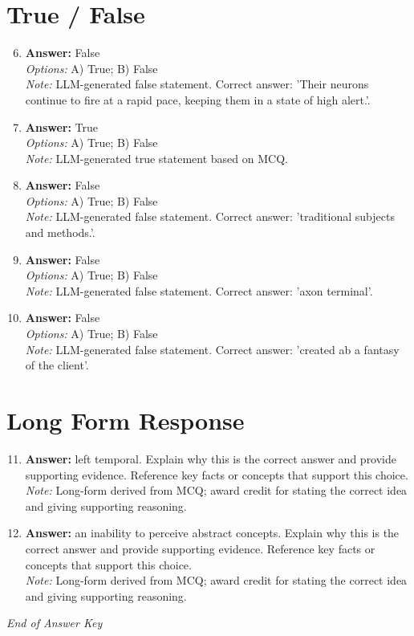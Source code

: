 \documentclass[12pt]{article}
\begin{document}
\section*{True / False}
\begin{enumerate}[label=\arabic*.]
\setcounter{enumi}{5}
\item \textbf{Answer:} False
\\ \textit{Options:} A) True; B) False
\\ \textit{Note:} LLM-generated false statement. Correct answer: 'Their neurons continue to fire at a rapid pace, keeping them in a state of high alert.'.
\item \textbf{Answer:} True
\\ \textit{Options:} A) True; B) False
\\ \textit{Note:} LLM-generated true statement based on MCQ.
\item \textbf{Answer:} False
\\ \textit{Options:} A) True; B) False
\\ \textit{Note:} LLM-generated false statement. Correct answer: 'traditional subjects and methods.'.
\item \textbf{Answer:} False
\\ \textit{Options:} A) True; B) False
\\ \textit{Note:} LLM-generated false statement. Correct answer: 'axon terminal'.
\item \textbf{Answer:} False
\\ \textit{Options:} A) True; B) False
\\ \textit{Note:} LLM-generated false statement. Correct answer: 'created ab a fantasy of the client'.
\end{enumerate}

\section*{Long Form Response}
\begin{enumerate}[label=\arabic*.]
\setcounter{enumi}{10}
\item \textbf{Answer:} left temporal. Explain why this is the correct answer and provide supporting evidence. Reference key facts or concepts that support this choice.
\\ \textit{Note:} Long-form derived from MCQ; award credit for stating the correct idea and giving supporting reasoning.
\item \textbf{Answer:} an inability to perceive abstract concepts. Explain why this is the correct answer and provide supporting evidence. Reference key facts or concepts that support this choice.
\\ \textit{Note:} Long-form derived from MCQ; award credit for stating the correct idea and giving supporting reasoning.
\end{enumerate}

\vfill
\noindent\textit{End of Answer Key}
\end{document}
